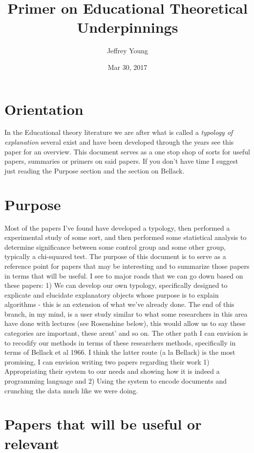 \documentclass[10pt, letterpaper]{article}
\author{Jeffrey Young}
\date{Mar 30, 2017}
\title{Primer on Educational Theoretical Underpinnings}
\begin{document}
\maketitle

\section*{Orientation}
\label{sec:org06e7acc}
In the Educational theory literature we are after what is called a \emph{typology of explanation} several exist and have been developed through the years see this paper \cite{brown1984explaining} for an overview. This document serves as a one stop shop of sorts for useful papers, summaries or primers on said papers. If you don't have time I suggest just reading the Purpose section and the section on Bellack.

\section*{Purpose}
\label{sec:orgc490358}
Most of the papers I've found have developed a typology, then performed a experimental study of some sort, and then performed some statistical analysis to determine significance between some control group and some other group, typically a chi-squared test. The purpose of this document is to serve as a reference point for papers that may be interesting and to summarize those papers in terms that will be useful. I see to major roads that we can go down based on these papers: 1) We can develop our own typology, specifically designed to explicate and elucidate explanatory objects whose purpose is to explain algorithms - this is an extension of what we've already done. The end of this branch, in my mind, is a user study similar to what some researchers in this area have done with lectures (see Rosenshine below), this would allow us to say these categories are important, these arent' and so on. The other path I can envision is to recodify our methods in terms of these researchers methods, specifically in terms of Bellack et al 1966. I think the latter route (a la Bellack) is the most promising, I can envision writing two papers regarding their work 1) Appropriating their system to our needs and showing how it is indeed a programming language and 2) Using the system to encode documents and crunching the data much like we were doing.

\section*{Papers that will be useful or relevant}
\label{sec:org2256e1e}
\end{document}
